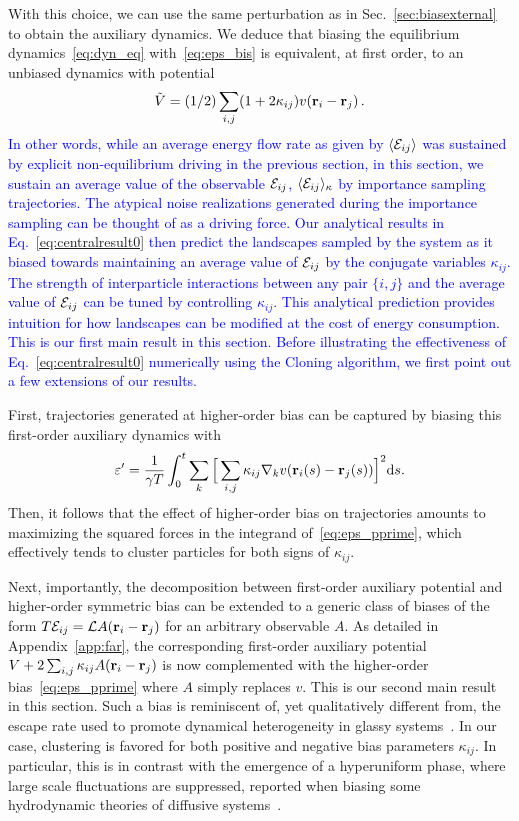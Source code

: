 \documentclass[superscriptaddress, twocolumn, prx, longbibliography, nofootinbib]{revtex4-1}
\begin{document}
With this choice, we can use the same perturbation as in Sec.~\ref{sec:biasexternal} to obtain the auxiliary dynamics. We deduce that biasing the equilibrium dynamics~\eqref{eq:dyn_eq} with~\eqref{eq:eps_bis} is equivalent, at first order, to an unbiased dynamics with potential 
\begin{equation}
\label{eq:centralresult0}
\tilde{V}=(1/2)\sum_{i,j}(1+2\kappa_{ij})v({\bf r}_i-{\bf r}_j)\,.
\end{equation}
\textcolor{blue}{In other words, while an average energy flow rate as given by $\langle {\cal E}_{ij}\rangle$ was sustained by explicit non-equilibrium driving in the previous section, in this section, we sustain an average value of the observable ${\cal E}_{ij}$, $\langle{\cal E}_{ij}\rangle_\kappa$ by importance sampling trajectories. The atypical noise realizations generated during the importance sampling can be thought of as a driving force. Our analytical results in Eq.~\ref{eq:centralresult0} then predict the landscapes sampled by the system as it biased towards maintaining an average value of ${\cal E}_{ij}$ by the conjugate variables $\kappa_{ij}$. The strength of interparticle interactions between any pair $\{i,j\}$ and the average value of ${\cal E}_{ij}$ can be tuned by controlling $\kappa_{ij}$. This analytical prediction provides intuition for how landscapes can be modified at the cost of energy consumption. This is our first main result in this section. Before illustrating the effectiveness of Eq.~\ref{eq:centralresult0} numerically using the Cloning algorithm, we first point out a few extensions of our results.}

First, trajectories generated at higher-order bias can be captured by biasing this first-order auxiliary dynamics with 
\begin{equation}\label{eq:eps_pprime}
	\varepsilon' = \frac{1}{\gamma T}\int_0^t\sum_k\Big[\sum_{i,j}\kappa_{ij} \nabla_kv({\bf r}_i(s)-{\bf r}_j(s))\Big]^2{\rm d}s .
\end{equation}
Then, it follows that the effect of higher-order bias on trajectories amounts to maximizing the squared forces in the integrand of~\eqref{eq:eps_pprime}, which effectively tends to cluster particles for both signs of $\kappa_{ij}$.


Next, importantly, the decomposition between first-order auxiliary potential and higher-order symmetric bias can be extended to a generic class of biases of the form $T{\cal E}_{ij} = {\cal L} A({\bf r}_i-{\bf r}_j)$ for an arbitrary observable $A$. As detailed in Appendix~\ref{app:far}, the corresponding first-order auxiliary potential $V+2\sum_{i,j}\kappa_{ij}A({\bf r}_i-{\bf r}_j)$ is now complemented with the higher-order bias~\eqref{eq:eps_pprime} where $A$ simply replaces $v$. This is our second main result in this section. Such a bias is reminiscent of, yet qualitatively different from, the escape rate used to promote dynamical heterogeneity in glassy systems~\cite{Pitard2011, Fullerton2013}. In our case, clustering is favored for both positive and negative bias parameters $\kappa_{ij}$. In particular, this is in contrast with the emergence of a hyperuniform phase, where large scale fluctuations are suppressed, reported when biasing some hydrodynamic theories of diffusive systems~\cite{Jack2015b}.
\end{document}
